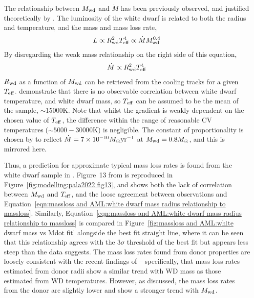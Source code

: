 The relationship between $M_{\rm wd}$ and $\dot M$ has been previously observed, and justified theoretically by \citet{Pala2021}.
The luminosity of the white dwarf is related to both the radius and temperature, and the mass and mass loss rate,
\begin{equation}
    L \propto R^2_{\rm wd} T_{\rm eff}^4 \propto \dot M M_{\rm wd}^{0.4}
\end{equation}
By disregarding the weak mass relationship on the right side of this equation,
\begin{equation}
    \label{eqn:massloss and AML:white dwarf mass radius relationship to massloss}
    \dot M \propto R_{\rm wd}^2 T_{\rm eff}^4
\end{equation}
$R_{\rm wd}$ as a function of $M_{\rm wd}$ can be retrieved from the \citet{Bergeron1995} cooling tracks for a given $T_{\rm eff}$.
\citet{Pala2021} demonstrate that there is no observable correlation between white dwarf temperature, and white dwarf mass, so $T_{\rm eff}$ can be assumed to be the mean of the \citet{Pala2021} sample, $\sim 15000$K.
Note that whilst the gradient is weakly dependent on the chosen value of $T_{\rm eff}$, the difference within the range of reasonable CV temperatures ($\sim 5000 - 30000$K) is negligible.
The constant of proportionality is chosen by \citet{Pala2021} to reflect $\dot M = 7\times 10^{-10} M_\odot {\rm yr^{-1}}$ at $M_{\rm wd} = 0.8 M_\odot$, and this is mirrored here.

Thus, a prediction for approximate typical mass loss rates is found from the white dwarf sample in \citet{Pala2021}. Figure~13 from \citet{Pala2021} is reproduced in Figure~\ref{fig:modelling:pala2022 fig13}, and shows both the lack of correlation between $M_{\rm wd}$ and $T_{\rm eff}$, and the loose agreement between observations and Equation~\ref{eqn:massloss and AML:white dwarf mass radius relationship to massloss}.
Similarly, Equation~\ref{eqn:massloss and AML:white dwarf mass radius relationship to massloss} is compared in Figure~\ref{fig:massloss and AML:white dwarf mass vs Mdot fit} alongside the best fit straight line, where it can be seen that this relationship agrees with the $3\sigma$ threshold of the best fit but appears less steep than the data suggests.
The mass loss rates found from donor properties are loosely consistent with the recent findings of \citet{Pala2021} -- specifically, that mass loss rates estimated from donor radii show a similar trend with WD mass as those estimated from WD temperatures. However, as discussed, the mass loss rates from the donor are slightly lower and show a stronger trend with $M_{\rm wd}$.

